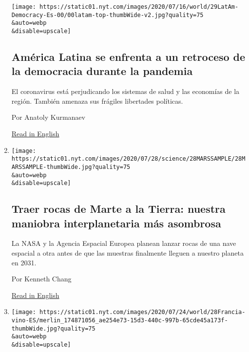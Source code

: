 \begin{enumerate}
  \texttt{[image: https://static01.nyt.com/images/2020/07/16/world/29LatAm-Democracy-Es-00/00latam-top-thumbWide-v2.jpg?quality=75\\\&auto=webp\\\&disable=upscale]}

  \hypertarget{amuxe9rica-latina-se-enfrenta-a-un-retroceso-de-la-democracia-durante-la-pandemia}{%
  \subsection{América Latina se enfrenta a un retroceso de la democracia
  durante la
  pandemia}\label{amuxe9rica-latina-se-enfrenta-a-un-retroceso-de-la-democracia-durante-la-pandemia}}

  El coronavirus está perjudicando los sistemas de salud y las economías
  de la región. También amenaza sus frágiles libertades políticas.

  Por Anatoly Kurmanaev

  \href{https://www.nytimes.com/2020/07/29/world/americas/latin-america-democracy-pandemic.html}{Read
  in English}
\item
  \href{/es/2020/07/29/espanol/ciencia-y-tecnologia/mision-marte-nasa.html}{}

  \texttt{[image: https://static01.nyt.com/images/2020/07/28/science/28MARSSAMPLE/28MARSSAMPLE-thumbWide.jpg?quality=75\\\&auto=webp\\\&disable=upscale]}

  \hypertarget{traer-rocas-de-marte-a-la-tierra-nuestra-maniobra-interplanetaria-muxe1s-asombrosa}{%
  \subsection{Traer rocas de Marte a la Tierra: nuestra maniobra
  interplanetaria más
  asombrosa}\label{traer-rocas-de-marte-a-la-tierra-nuestra-maniobra-interplanetaria-muxe1s-asombrosa}}

  La NASA y la Agencia Espacial Europea planean lanzar rocas de una nave
  espacial a otra antes de que las muestras finalmente lleguen a nuestro
  planeta en 2031.

  Por Kenneth Chang

  \href{https://www.nytimes.com/2020/07/28/science/mars-sample-return-mission.html}{Read
  in English}
\item
  \href{/es/2020/07/28/espanol/mundo/vino-blanco-alsacia-coronavirus.html}{}

  \texttt{[image: https://static01.nyt.com/images/2020/07/24/world/28Francia-vino-ES/merlin\_174871056\_ae254e73-15d3-440c-997b-65cde45a173f-thumbWide.jpg?quality=75\\\&auto=webp\\\&disable=upscale]}


\end{enumerate}
